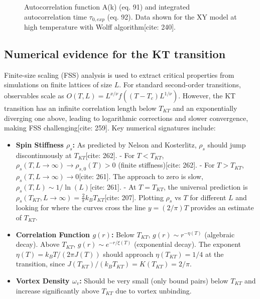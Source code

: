 \documentclass[11pt]{article}
\begin{document}
\begin{figure}[h!]
    \centering
    \caption{Autocorrelation function A(k) (eq. 91) and integrated autocorrelation time $\tau_{0, exp}$ (eq. 92). Data shown for the XY model at high temperature with Wolff algorithm[cite: 240].}
    \label{fig:autocorrelation}
\end{figure}

\subsection{Numerical evidence for the KT transition}

Finite-size scaling (FSS) analysis is used to extract critical properties from simulations on finite lattices of size $L$. For standard second-order transitions, observables scale as $O(T, L) = L^{x/\nu} f((T-T_c) L^{1/\nu})$. However, the KT transition has an infinite correlation length below $T_{KT}$ and an exponentially diverging one above, leading to logarithmic corrections and slower convergence, making FSS challenging[cite: 259].
Key numerical signatures include:
\begin{itemize}
    \item \textbf{Spin Stiffness $\rho_s$:} As predicted by Nelson and Kosterlitz, $\rho_s$ should jump discontinuously at $T_{KT}$[cite: 262].
        - For $T < T_{KT}$, $\rho_s(T, L \to \infty) \to \rho_{s,0}(T) > 0$ (finite stiffness)[cite: 262].
        - For $T > T_{KT}$, $\rho_s(T, L \to \infty) \to 0$[cite: 261]. The approach to zero is slow, $\rho_s(T, L) \sim 1 / \ln(L)$[cite: 261].
        - At $T = T_{KT}$, the universal prediction is $\rho_s(T_{KT}, L \to \infty) = \frac{2}{\pi} k_B T_{KT}$[cite: 207]. Plotting $\rho_s$ vs $T$ for different $L$ and looking for where the curves cross the line $y = (2/\pi) T$ provides an estimate of $T_{KT}$.
    \item \textbf{Correlation Function $g(r)$:} Below $T_{KT}$, $g(r) \sim r^{-\eta(T)}$ (algebraic decay). Above $T_{KT}$, $g(r) \sim e^{-r/\xi(T)}$ (exponential decay). The exponent $\eta(T) = k_B T / (2\pi J(T))$ should approach $\eta(T_{KT}) = 1/4$ at the transition, since $J(T_{KT}) / (k_B T_{KT}) = K(T_{KT}) = 2/\pi$.
    \item \textbf{Vortex Density $\omega_v$:} Should be very small (only bound pairs) below $T_{KT}$ and increase significantly above $T_{KT}$ due to vortex unbinding.
\end{itemize}
\end{document}
